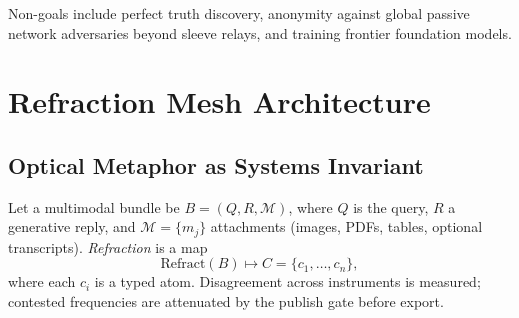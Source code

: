 \documentclass[journal,10pt,twocolumn,a4paper]{IEEEtran}
\begin{document}
Non-goals include perfect truth discovery, anonymity against global passive network adversaries beyond sleeve relays, and training frontier foundation models.

\section{Refraction Mesh Architecture}
\label{sec:rma}

\subsection{Optical Metaphor as Systems Invariant}
Let a multimodal bundle be $B=(Q,R,\mathcal{M})$, where $Q$ is the query, $R$ a generative reply, and $\mathcal{M}=\{m_j\}$ attachments (images, PDFs, tables, optional transcripts).
\emph{Refraction} is a map
\begin{equation}
\mathrm{Refract}(B)\mapsto C=\{c_1,\ldots,c_n\},
\end{equation}
where each $c_i$ is a typed atom.
Disagreement across instruments is measured; contested frequencies are attenuated by the publish gate before export.
\end{document}
